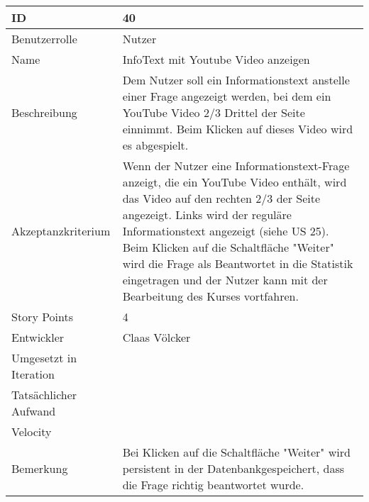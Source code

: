 \begin{tabularx}{\textwidth}{|p{}|X|}
	\hline
	ID & 40\\
	\hline
	Benutzerrolle & Nutzer\\
	\hline
	Name & InfoText mit Youtube Video anzeigen\\
	\hline
	Beschreibung & Dem Nutzer soll ein Informationstext anstelle einer Frage angezeigt werden, bei dem ein YouTube Video 2/3 Drittel der Seite einnimmt. Beim Klicken auf dieses Video wird es abgespielt.\\
	\hline
	Akzeptanzkriterium & Wenn der Nutzer eine Informationstext-Frage anzeigt, die ein YouTube Video enthält, wird das Video auf den rechten 2/3 der Seite angezeigt. Links wird der reguläre Informationstext angezeigt (siehe US 25). Beim Klicken auf die Schaltfläche "Weiter" wird die Frage als Beantwortet in die Statistik eingetragen und der Nutzer kann mit der Bearbeitung des Kurses vortfahren.\\
	\hline
	Story Points & 4\\
	\hline
	Entwickler & Claas Völcker\\
	\hline
	Umgesetzt in Iteration & \\
	\hline
	Tatsächlicher Aufwand & \\
	\hline
	Velocity & \\
	\hline
	Bemerkung & Bei Klicken auf die Schaltfläche "Weiter" wird persistent in der Datenbankgespeichert, dass die Frage richtig beantwortet wurde.\\
	\hline
\end{tabularx}
\vspace{20pt}
